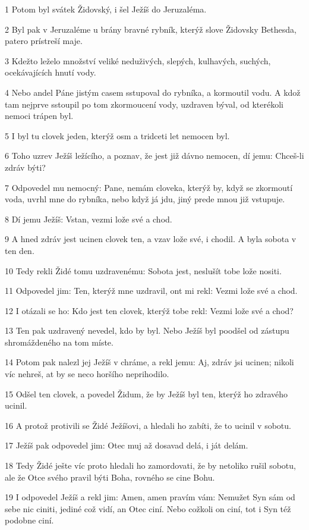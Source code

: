 \par 1 Potom byl svátek Židovský, i šel Ježíš do Jeruzaléma.
\par 2 Byl pak v Jeruzaléme u brány bravné rybník, kterýž slove Židovsky Bethesda, patero prístreší maje.
\par 3 Kdežto leželo množství veliké neduživých, slepých, kulhavých, suchých, ocekávajících hnutí vody.
\par 4 Nebo andel Páne jistým casem sstupoval do rybníka, a kormoutil vodu. A kdož tam nejprve sstoupil po tom zkormoucení vody, uzdraven býval, od kterékoli nemoci trápen byl.
\par 5 I byl tu clovek jeden, kterýž osm a tridceti let nemocen byl.
\par 6 Toho uzrev Ježíš ležícího, a poznav, že jest již dávno nemocen, dí jemu: Chceš-li zdráv býti?
\par 7 Odpovedel mu nemocný: Pane, nemám cloveka, kterýž by, když se zkormoutí voda, uvrhl mne do rybníka, nebo když já jdu, jiný prede mnou již vstupuje.
\par 8 Dí jemu Ježíš: Vstan, vezmi lože své a chod.
\par 9 A hned zdráv jest ucinen clovek ten, a vzav lože své, i chodil. A byla sobota v ten den.
\par 10 Tedy rekli Židé tomu uzdravenému: Sobota jest, neslušít tobe lože nositi.
\par 11 Odpovedel jim: Ten, kterýž mne uzdravil, ont mi rekl: Vezmi lože své a chod.
\par 12 I otázali se ho: Kdo jest ten clovek, kterýž tobe rekl: Vezmi lože své a chod?
\par 13 Ten pak uzdravený nevedel, kdo by byl. Nebo Ježíš byl poodšel od zástupu shromáždeného na tom míste.
\par 14 Potom pak nalezl jej Ježíš v chráme, a rekl jemu: Aj, zdráv jsi ucinen; nikoli víc nehreš, at by se neco horšího neprihodilo.
\par 15 Odšel ten clovek, a povedel Židum, že by Ježíš byl ten, kterýž ho zdravého ucinil.
\par 16 A protož protivili se Židé Ježíšovi, a hledali ho zabíti, že to ucinil v sobotu.
\par 17 Ježíš pak odpovedel jim: Otec muj až dosavad delá, i ját delám.
\par 18 Tedy Židé ješte víc proto hledali ho zamordovati, že by netoliko rušil sobotu, ale že Otce svého pravil býti Boha, rovného se cine Bohu.
\par 19 I odpovedel Ježíš a rekl jim: Amen, amen pravím vám: Nemužet Syn sám od sebe nic ciniti, jediné což vidí, an Otec ciní. Nebo cožkoli on ciní, tot i Syn též podobne ciní.
